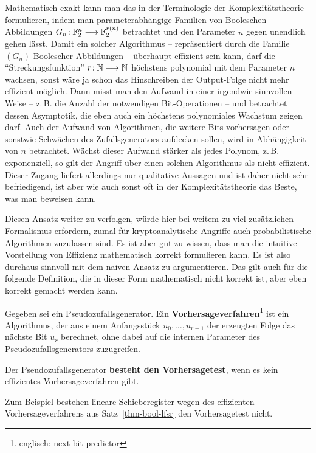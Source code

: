 \begin{refsegment}
Mathematisch exakt kann man das in der Terminologie der
Komplexitätstheorie
formulieren, indem man parameterabhängige Familien
von Booleschen Abbildungen
\mbox{$G_n\!: \mathbb{F}_2^n \longrightarrow \mathbb{F}_2^{r(n)}$} betrachtet und den
Parameter $n$ gegen unendlich gehen lässt. Damit ein solcher
Algorithmus -- repräsentiert durch die Familie $(G_n)$ Boolescher
Abbildungen -- überhaupt effizient sein kann, darf die "`Streckungsfunktion"'
$r\!: \mathbb{N} \longrightarrow \mathbb{N}$ höchstens polynomial mit dem Parameter
$n$ wachsen, sonst wäre ja schon das Hinschreiben der Output-Folge
nicht mehr effizient möglich. Dann misst man den
Aufwand in einer irgendwie sinnvollen Weise -- z.\,B. die Anzahl der
notwendigen Bit-Operationen -- und betrachtet dessen Asymptotik,
die eben auch ein höchstens polynomiales Wachstum zeigen darf.
Auch der Aufwand von Algorithmen, die weitere Bits vorhersagen
oder sonstwie Schwächen des Zufallsgenerators aufdecken sollen,
wird in Abhängigkeit von $n$ betrachtet. Wächst dieser Aufwand
stärker als jedes Polynom, z.\,B. exponenziell, so gilt der
Angriff über einen solchen Algorithmus als nicht effizient.
Dieser Zugang liefert allerdings nur qualitative Aussagen und
ist daher nicht sehr befriedigend, ist aber wie auch sonst oft
in der Komplexitätstheorie das Beste, was man beweisen kann.

Diesen Ansatz weiter zu verfolgen, würde hier bei weitem zu viel
zusätzlichen Formalismus erfordern, zumal für kryptoanalytische
Angriffe auch probabilistische Algorithmen zuzulassen sind.
Es ist aber gut zu wissen,
dass man die intuitive Vorstellung von Effizienz mathematisch
korrekt formulieren kann. Es ist also durchaus sinnvoll mit dem
naiven Ansatz zu argumentieren. Das gilt auch für die folgende
Definition, die in dieser Form mathematisch nicht korrekt ist,
aber eben korrekt gemacht werden kann.

\begin{definition}\label{def-bool-prg-pred}
  Gegeben sei ein Pseudozufallsgenerator.
  Ein {\bf  Vorhersageverfahren}\footnote{%
    englisch: next bit predictor
  } ist ein Algorithmus, der aus einem
  Anfangsstück $u_0, \ldots, u_{r-1}$ der erzeugten Folge das nächste
  Bit $u_r$ berechnet, ohne dabei auf die internen Parameter des
  Pseudozufallsgenerators zuzugreifen.

  Der Pseudozufallsgenerator {\bf besteht den
  Vorhersagetest}, wenn
  es kein effizientes Vorhersageverfahren gibt.
\end{definition}
Zum Beispiel bestehen
lineare Schieberegister
wegen des effizienten
Vorhersageverfahrens aus Satz~\ref{thm-bool-lfsr} den Vorhersagetest nicht.


\end{refsegment}
